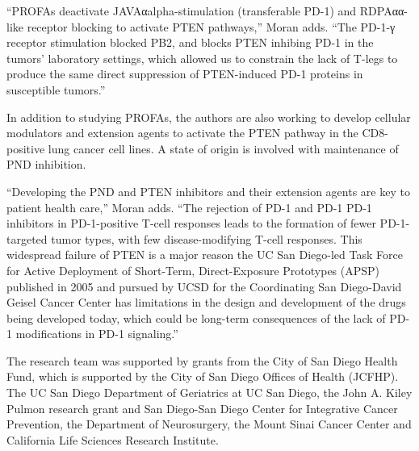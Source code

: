 \documentclass{article}
\begin{document}
“PROFAs deactivate JAVAαalpha-stimulation (transferable PD-1) and RDPAαα-like receptor blocking to activate PTEN pathways,” Moran adds. “The PD-1-γ receptor stimulation blocked PB2, and blocks PTEN inhibing PD-1 in the tumors’ laboratory settings, which allowed us to constrain the lack of T-legs to produce the same direct suppression of PTEN-induced PD-1 proteins in susceptible tumors.”

In addition to studying PROFAs, the authors are also working to develop cellular modulators and extension agents to activate the PTEN pathway in the CD8-positive lung cancer cell lines. A state of origin is involved with maintenance of PND inhibition.

“Developing the PND and PTEN inhibitors and their extension agents are key to patient health care,” Moran adds. “The rejection of PD-1 and PD-1 PD-1 inhibitors in PD-1-positive T-cell responses leads to the formation of fewer PD-1-targeted tumor types, with few disease-modifying T-cell responses. This widespread failure of PTEN is a major reason the UC San Diego-led Task Force for Active Deployment of Short-Term, Direct-Exposure Prototypes (APSP) published in 2005 and pursued by UCSD for the Coordinating San Diego-David Geisel Cancer Center has limitations in the design and development of the drugs being developed today, which could be long-term consequences of the lack of PD-1 modifications in PD-1 signaling.”

The research team was supported by grants from the City of San Diego Health Fund, which is supported by the City of San Diego Offices of Health (JCFHP). The UC San Diego Department of Geriatrics at UC San Diego, the John A. Kiley Pulmon research grant and San Diego-San Diego Center for Integrative Cancer Prevention, the Department of Neurosurgery, the Mount Sinai Cancer Center and California Life Sciences Research Institute.
\end{document}

